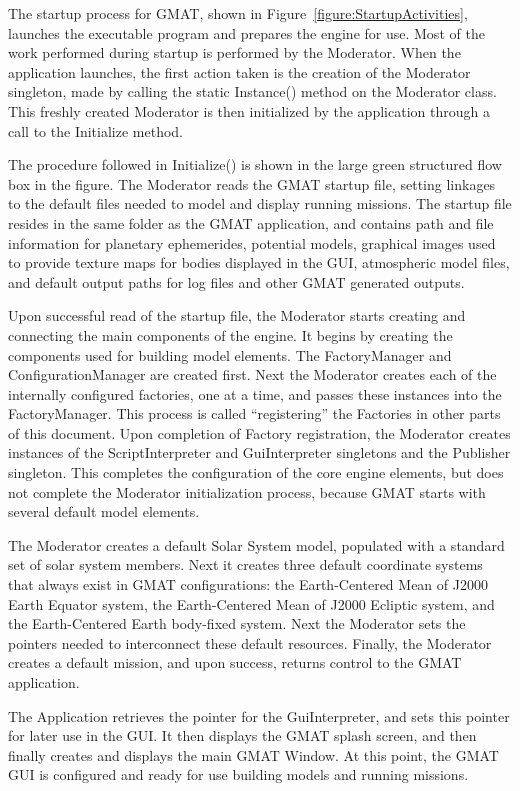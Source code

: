 The startup process for GMAT, shown in Figure~\ref{figure:StartupActivities}, launches the
executable program and prepares the engine for use.  Most of the work performed during startup is
performed by the Moderator.  When the application launches, the first action taken is the creation
of the Moderator singleton, made by calling the static Instance() method on the Moderator class.
This freshly created Moderator is then initialized by the application through a call to the
Initialize{} method.

The procedure followed in Initialize() is shown in the large green structured flow box in the
figure.  The Moderator reads the GMAT startup file, setting linkages to the default files needed to
model and display running missions.  The startup file resides in the same folder as the GMAT
application, and contains path and file information for planetary ephemerides, potential models,
graphical images used to provide texture maps for bodies displayed in the GUI, atmospheric model
files, and default output paths for log files and other GMAT generated outputs.

Upon successful read of the startup file, the Moderator starts creating and connecting the main
components of the engine.  It begins by creating the components used for building model elements.
The FactoryManager and ConfigurationManager are created first.  Next the Moderator creates each of
the internally configured factories, one at a time, and passes these instances into the
FactoryManager.  This process is called ``registering'' the Factories in other parts of this
document.  Upon completion of Factory registration, the Moderator creates instances of the
ScriptInterpreter and GuiInterpreter singletons and the Publisher singleton.  This completes the
configuration of the core engine elements, but does not complete the Moderator initialization
process, because GMAT starts with several default model elements.

The Moderator creates a default Solar System model, populated with a standard set of solar system
members.  Next it creates three default coordinate systems that always exist in GMAT configurations:
the Earth-Centered Mean of J2000 Earth Equator system, the Earth-Centered Mean of J2000 Ecliptic
system, and the Earth-Centered Earth body-fixed system.  Next the Moderator sets the pointers
needed to interconnect these default resources.  Finally, the Moderator creates a default mission,
and upon success, returns control to the GMAT application.

The Application retrieves the pointer for the GuiInterpreter, and sets this pointer for later use in
the GUI.  It then displays the GMAT splash screen, and then finally creates and displays the main
GMAT Window.  At this point, the GMAT GUI is configured and ready for use building models and
running missions.

